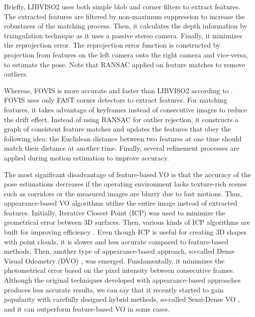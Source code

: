 \documentclass[12pt]{report}
\numberwithin{figure}{section}
\begin{document}
Briefly, LIBVISO2 uses both 
simple blob and corner filters to extract features. The extracted features are 
filtered by non-maximum suppression to increase the robustness of the matching 
process. Then, it calculates the depth information by triangulation technique 
as it uses a passive stereo camera. Finally, it minimizes the reprojection 
error. The reprojection error function is constructed by projection from 
features on the left camera onto the right camera and vice-versa, to estimate 
the pose. Note that RANSAC applied on feature matches to remove outliers. 

Whereas, FOVIS is more accurate and faster than LIBVISO2 according to 
\parencite{Fang2015a}.
FOVIS uses only FAST corner detectors to extract features. For matching 
features, it takes advantage of keyframes instead of consecutive images to 
reduce the drift effect. Instead of using RANSAC for outlier rejection, it 
constructs 
a graph of consistent feature matches and updates the features that obey the 
following idea: the Euclidean distance between two features at one time should 
match 
their distance at another time. Finally, several refinement processes are 
applied during motion estimation to improve accuracy.

The most significant disadvantage of feature-based VO is that the accuracy of 
the pose estimations decreases if the operating environment lacks texture-rich 
scenes such as corridors or the measured images are blurry due to fast 
motions. Thus, appearance-based VO algorithms utilize the entire image instead 
of extracted features. Initially, Iterative Closest Point (ICP) 
\parencite{Besl1992} was used to minimize the geometrical error between 3D 
surfaces. Then, various kinds of ICP algorithms are built for improving 
efficiency \parencite{Rusinkiewicz2001}. Even though ICP is useful for 
creating 
3D 
shapes with point clouds, it is slower and less accurate compared to 
feature-based methods.
Then, another type of appearance-based approach, so-called Dense Visual 
Odometry (DVO) \parencite{Kerl2013a}, was emerged. Fundamentally, it minimizes 
the 
photometrical 
error based on the pixel intensity between consecutive frames. Although the 
original techniques developed with appearance-based approaches produces less 
accurate results, we can say that it recently started to gain popularity with 
carefully designed hybrid methods, so-called Semi-Dense VO 
\parencite{Zhou2017a}, 
and it can outperform feature-based VO in some cases.
\end{document}
